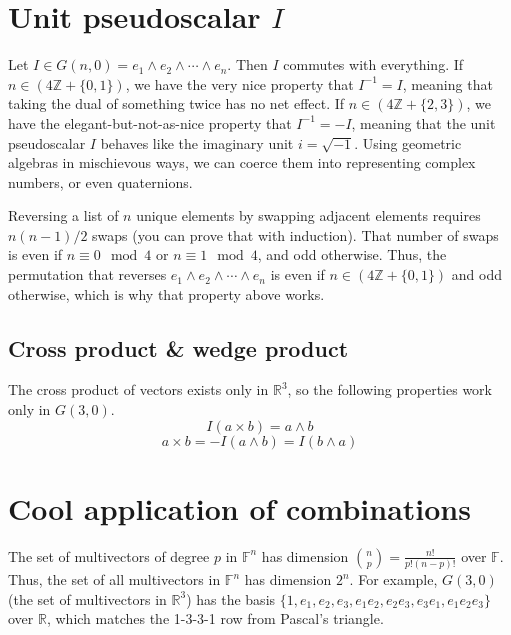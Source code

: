 \documentclass[12pt]{article}
\begin{document}
\section{Unit pseudoscalar $I$}
Let $I \in G(n, 0) = e_1 \wedge e_2 \wedge \cdots \wedge e_n$. Then $I$ commutes with everything. If $n \in (4 \mathbb{Z} + \{0, 1\})$, we have the very nice property that $I^{-1} = I$, meaning that taking the dual of something twice has no net effect. If $n \in (4 \mathbb{Z} + \{2, 3\})$, we have the elegant-but-not-as-nice property that $I^{-1} = -I$, meaning that the unit pseudoscalar $I$ behaves like the imaginary unit $i = \sqrt{-1}$. Using geometric algebras in mischievous ways, we can coerce them into representing complex numbers, or even quaternions.

Reversing a list of $n$ unique elements by swapping adjacent elements requires $n(n-1)/2$ swaps (you can prove that with induction). That number of swaps is even if $n \equiv 0 \mod{4}$ or $n \equiv 1 \mod{4}$, and odd otherwise. Thus, the permutation that reverses $e_1 \wedge e_2 \wedge \cdots \wedge e_n$ is even if $n \in (4 \mathbb{Z} + \{0, 1\})$ and odd otherwise, which is why that property above works.

\subsection{Cross product \& wedge product}
The cross product of vectors exists only in $\mathbb{R}^3$, so the following properties work only in $G(3, 0)$.
\[I (a \times b) = a \wedge b\]
\[a \times b = -I (a \wedge b) = I (b \wedge a)\]


\section{Cool application of combinations}
The set of multivectors of degree $p$ in $\mathbb{F}^n$ has dimension ${n \choose p} = \frac{n!}{p!(n-p)!} $ over $\mathbb{F}$. Thus, the set of all multivectors in $\mathbb{F}^n$ has dimension $2^n$. For example, $G(3,0)$ (the set of multivectors in $\mathbb{R}^3$) has the basis $\{1, e_1, e_2, e_3, e_1 e_2, e_2 e_3, e_3 e_1, e_1 e_2 e_3\}$ over $\mathbb{R}$, which matches the 1-3-3-1 row from Pascal's triangle.
\end{document}
